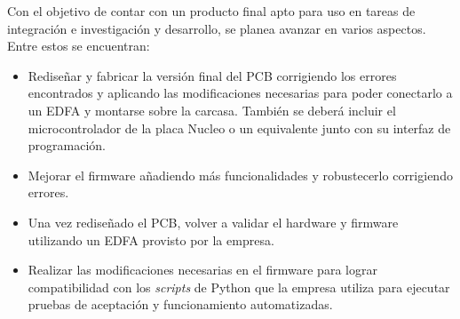 Con el objetivo de contar con un producto final apto para uso en tareas de integración e investigación y desarrollo, se planea avanzar en varios aspectos. Entre estos se encuentran:

\begin{itemize}
\item Rediseñar y fabricar la versión final del PCB corrigiendo los errores encontrados y aplicando las modificaciones necesarias para poder conectarlo a un EDFA y montarse sobre la carcasa. También se deberá incluir el microcontrolador de la placa Nucleo o un equivalente junto con su interfaz de programación.
\item Mejorar el firmware añadiendo más funcionalidades y robustecerlo corrigiendo errores.
\item Una vez rediseñado el PCB, volver a validar el hardware y firmware utilizando un EDFA provisto por la empresa.
\item Realizar las modificaciones necesarias en el firmware para lograr compatibilidad con los \textit{scripts} de Python que la empresa utiliza para ejecutar pruebas de aceptación y funcionamiento automatizadas.
\end{itemize}